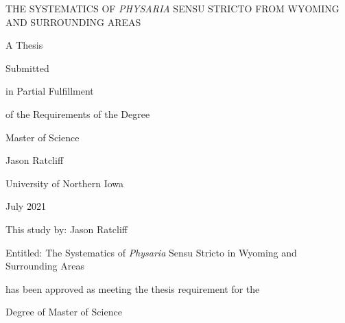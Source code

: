 \clearpage

\clearpage
\thispagestyle{empty}
\begin{center}
THE SYSTEMATICS OF \textit{PHYSARIA} SENSU STRICTO FROM WYOMING
AND SURROUNDING AREAS
\end{center}
\vspace{120pt}
\begin{center}
  A Thesis

  Submitted

  in Partial Fulfillment

  of the Requirements of the Degree

  Master of Science
\end{center}
\vspace{120pt}
\begin{center}
  Jason Ratcliff

  University of Northern Iowa

  July 2021
\end{center}

\clearpage
\pagestyle{contents}  %
\setcounter{page}{2}  %

This study by: Jason Ratcliff

Entitled: The Systematics of \textit{Physaria} Sensu Stricto in Wyoming and
Surrounding Areas

\vspace*{24pt}

has been approved as meeting the thesis requirement for the

Degree of Master of Science

\vspace*{24pt}

\singlespacing

